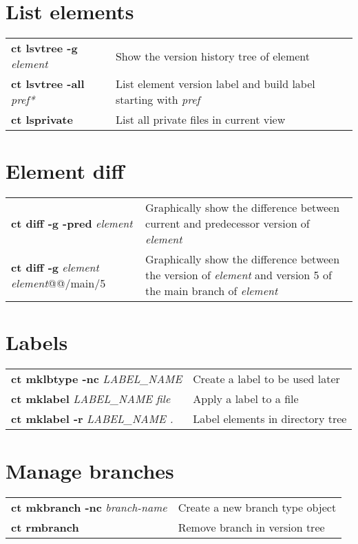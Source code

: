 \documentclass[10pt,twocolumn]{article}
\begin{document}
\section*{List elements}
\begin{tabularx}{10.2cm}{l|X}
  \textbf{ct lsvtree -g} \textit{element}    & Show the version history tree of element \\
  \textbf{ct lsvtree -all} \textit{pref*} & List element version label and build label starting with \textit{pref}\\
  \textbf{ct lsprivate}                   & List all private files in current view \\
\end{tabularx}

\section*{Element diff}
\begin{tabularx}{10.2cm}{>{\hsize=4.6cm}X|>{\hsize=4.7cm}X}
  \textbf{ct diff -g -pred} \textit{element}            & Graphically show the difference between current and predecessor version of \textit{element} \\ 
  \textbf{ct diff -g} \textit{element element}@@/main/5 & Graphically show the difference between the version of \textit{element} and version 5 of the main branch of \textit{element} \\
\end{tabularx}

\section*{Labels}
\begin{tabularx}{10.2cm}{l|X}
  \textbf{ct mklbtype -nc} \textit{LABEL\_NAME} & Create a label to be used later \\
 \textbf{ct mklabel} \textit{LABEL\_NAME file} & Apply a label to a file \\
 \textbf{ct mklabel -r} \textit{LABEL\_NAME .} & Label elements in directory tree \\ 
\end{tabularx}

\section*{Manage branches}
\begin{tabularx}{10.2cm}{l|X}
 \textbf{ct mkbranch -nc} \textit{branch-name} & Create a new branch type object  \\ 
 \textbf{ct rmbranch} & Remove branch in version tree \\
\end{tabularx}
\end{document}
